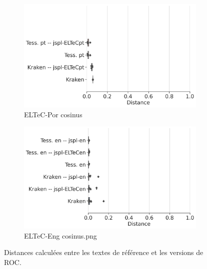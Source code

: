 \begin{figure}[h!]
    \begin{subfigure}{0.5\textwidth}
  \includegraphics[height=.65\textwidth]{IMAGES/Boite-moustache/ELTeC-Por_REF_cosinus.png} 
        \caption{ELTeC-Por cosinus}
        \label{fig:ELTeC-Por_REF_cosinus}
   \end{subfigure}   
         \begin{subfigure}{0.45\textwidth}
  \includegraphics[height=.65\textwidth]{IMAGES/Boite-moustache/ELTeC-Eng_REF_cosinus.png} 
        \caption{ELTeC-Eng cosinus.png}
   \end{subfigure}   
    \caption{Distances calculées entre les textes de référence et les versions de ROC.}
    \label{fig:distances_ref_roc}
\end{figure}

